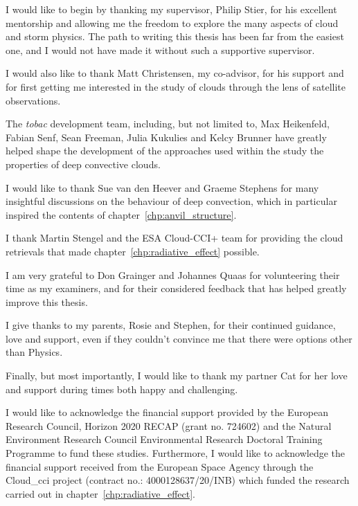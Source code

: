\begin{acknowledgements}

I would like to begin by thanking my supervisor, Philip Stier, for his excellent mentorship and allowing me the freedom to explore the many aspects of cloud and storm physics.
The path to writing this thesis has been far from the easiest one, and I would not have made it without such a supportive supervisor.

I would also like to thank Matt Christensen, my co-advisor, for his support and for first getting me interested in the study of clouds through the lens of satellite observations.

The \textit{tobac} development team, including, but not limited to, Max Heikenfeld, Fabian Senf, Sean Freeman, Julia Kukulies and Kelcy Brunner have greatly helped shape the development of the approaches used within the study the properties of deep convective clouds.

I would like to thank Sue van den Heever and Graeme Stephens for many insightful discussions on the behaviour of deep convection, which in particular inspired the contents of chapter~\ref{chp:anvil_structure}.

I thank Martin Stengel and the ESA Cloud-CCI+ team for providing the cloud retrievals that made chapter~\ref{chp:radiative_effect} possible.

I am very grateful to Don Grainger and Johannes Quaas for volunteering their time as my examiners, and for their considered feedback that has helped greatly improve this thesis.

I give thanks to my parents, Rosie and Stephen, for their continued guidance, love and support, even if they couldn't convince me that there were options other than Physics.

Finally, but most importantly, I would like to thank my partner Cat for her love and support during times both happy and challenging.


I would like to acknowledge the financial support provided by the European Research Council, Horizon 2020 RECAP (grant no. 724602) and the Natural Environment Research Council Environmental Research Doctoral Training Programme to fund these studies. Furthermore, I would like to acknowledge the financial support received from the European Space Agency through the Cloud\_cci project (contract no.: 4000128637/20/INB) which funded the research carried out in chapter~\ref{chp:radiative_effect}.

\end{acknowledgements}

